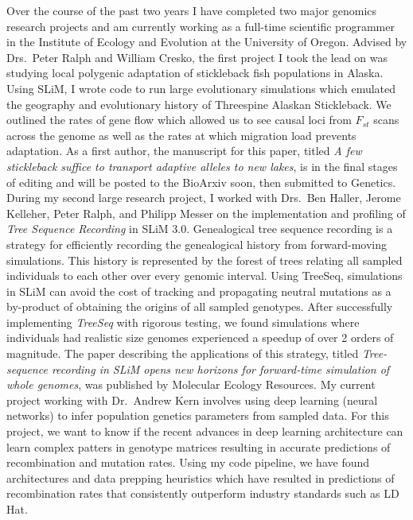 \documentclass[10pt]{amsart}
\newcommand{\sepspace}{\vspace*{1em}}		%
\begin{document}
Over the course of the past two years I have completed two major genomics research projects and am currently working as a full-time scientific programmer in the Institute of Ecology and Evolution at the University of Oregon.
Advised by Drs.\ Peter Ralph and William Cresko, the first project I took the lead on was studying local polygenic adaptation of stickleback fish populations in Alaska. 
Using SLiM, I wrote code to run large evolutionary simulations which emulated the geography and evolutionary history of Threespine Alaskan Stickleback.
We outlined the rates of gene flow which allowed us to see causal loci from $F_{st}$ scans across the genome as well as the rates at which migration load prevents adaptation.
As a first author, the manuscript for this paper, titled \textit{A few stickleback suffice to transport adaptive alleles to new lakes}, is in the final stages of editing and will be posted to the BioArxiv soon, then submitted to Genetics. 
During my second large research project, I worked with Drs.\ Ben Haller, Jerome Kelleher, Peter Ralph, and Philipp Messer on the implementation and profiling of \textit{Tree Sequence Recording} in SLiM 3.0.
Genealogical tree sequence recording is a strategy for efficiently recording the genealogical history from forward-moving simulations. 
This history is represented by the forest of trees relating all sampled individuals to each other over every genomic interval. 
Using TreeSeq, simulations in SLiM can avoid the cost of tracking and propagating neutral mutations as a by-product of obtaining the origins of all sampled genotypes.
After successfully implementing \textit{TreeSeq} with rigorous testing, we found simulations where individuals had realistic size genomes experienced a speedup of over 2 orders of magnitude. 
The paper describing the applications of this strategy, titled \textit{Tree-sequence recording in SLiM opens new horizons for forward-time simulation of whole genomes}, was published by Molecular Ecology Resources.
My current project working with Dr.\ Andrew Kern involves using deep learning (neural networks) to infer population genetics parameters from sampled data. 
For this project, we want to know if the recent advances in deep learning architecture can learn complex patters in genotype matrices resulting in accurate predictions of recombination and mutation rates. 
Using my code pipeline, we have found architectures and data prepping heuristics which have resulted in predictions of recombination rates that consistently outperform industry standards such as LD Hat. 
\sepspace
\end{document}
